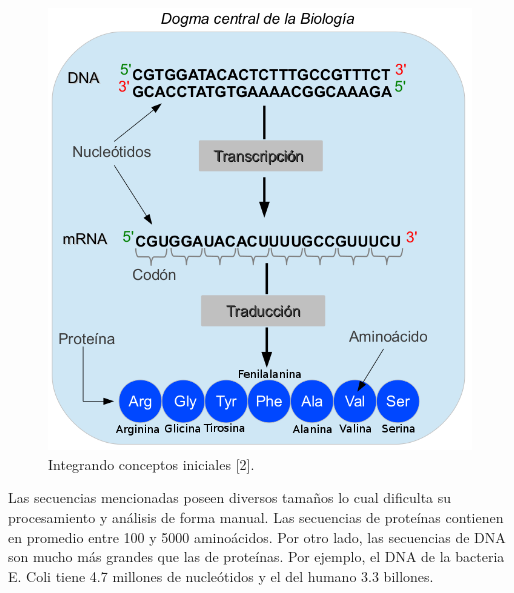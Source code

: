 \begin{figure}[h!]
    \centering
    \includegraphics[scale=0.45]{image/resumen.png}
    \caption{Integrando conceptos iniciales [2].}
    \label{figIntro} 
\end{figure}    

\par Las secuencias mencionadas poseen diversos tamaños lo cual dificulta su procesamiento y análisis de forma manual. Las secuencias de proteínas contienen en promedio entre 100 y 5000 aminoácidos. Por otro lado, las secuencias de DNA son mucho más grandes que las de proteínas. Por ejemplo, el DNA de la bacteria E. Coli tiene 4.7 millones de nucleótidos y el del humano 3.3 billones.

